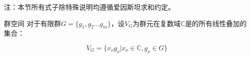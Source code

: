 \begin{issues}
\issueDraft
\end{issues}

注：本节所有式子除特殊说明均遵循爱因斯坦求和约定。

\begin{definition}{群空间}
对于有限群$G=\{g_1,g_2...g_m\}$，设$V_G$为群元在复数域$\mathbb{C}$是的所有线性叠加的集合：

\begin{equation}
V_G=\{x_\nu g_\nu|x_\nu \in \mathbb{C},g_\nu \in G\}
\end{equation}

\end{definition}